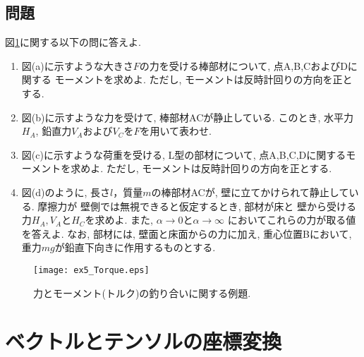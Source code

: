 \documentclass[10pt,a4j]{jarticle}
\begin{document}
\subsection{問題}
図\ref{fig:ex5_Torque}に関する以下の問に答えよ.
\begin{enumerate}
\item
図(a)に示すような大きさ$F$の力を受ける棒部材について, 点A,B,CおよびDに関する
モーメントを求めよ. ただし, モーメントは反時計回りの方向を正とする. 
\item
図(b)に示すような力を受けて, 棒部材ACが静止している. このとき, 水平力$H_A$, 
鉛直力$V_A$および$V_C$を$F$を用いて表わせ. 
\item
図(c)に示すような荷重を受ける, L型の部材について, 点A,B,C,Dに関するモーメントを求めよ. 
ただし, モーメントは反時計回りの方向を正とする. 
\item
図(d)のように, 長さ$l$，質量$m$の棒部材ACが, 壁に立てかけられて静止している. 
摩擦力が 壁側では無視できると仮定するとき, 部材が床と
壁から受ける力$H_A, V_A$と$H_C$を求めよ. また, $\alpha\rightarrow 0$と$\alpha \rightarrow \infty$
においてこれらの力が取る値を答えよ. なお, 部材には, 壁面と床面からの力に加え, 
重心位置Bにおいて, 重力$mg$が鉛直下向きに作用するものとする. 
\end{enumerate}
\begin{figure}[h]
	\begin{center}
	\texttt{[image: ex5\_Torque.eps]} 
	\end{center}
	\caption{力とモーメント(トルク)の釣り合いに関する例題.} 
	\label{fig:ex5_Torque}
\end{figure}
\section{ベクトルとテンソルの座標変換}
\end{document}
